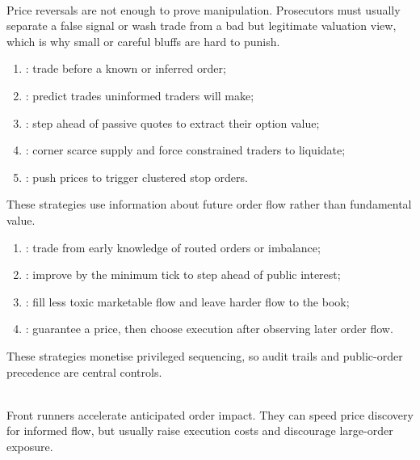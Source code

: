 \begin{caveat} \\
Price reversals are not enough to prove manipulation. Prosecutors must usually separate a false signal or wash trade from a bad but legitimate valuation view, which is why small or careful bluffs are hard to punish.
\end{caveat}

\begin{taxonomy} 
\begin{enumerate}[label=\roman*.]
\setlength{\itemsep}{0pt}
\item {}: trade before a known or inferred order;
\item {}: predict trades uninformed traders will make;
\item {}: step ahead of passive quotes to extract their option value;
\item {}: corner scarce supply and force constrained traders to liquidate;
\item {}: push prices to trigger clustered stop orders.
\end{enumerate}
These strategies use information about future order flow rather than fundamental value.
\end{taxonomy}

\begin{taxonomy} 
\begin{enumerate}[label=\roman*.]
\setlength{\itemsep}{0pt}
\item {}: trade from early knowledge of routed orders or imbalance;
\item {}: improve by the minimum tick to step ahead of public interest;
\item {}: fill less toxic marketable flow and leave harder flow to the book;
\item {}: guarantee a price, then choose execution after observing later order flow.
\end{enumerate}
These strategies monetise privileged sequencing, so audit trails and public-order precedence are central controls.
\end{taxonomy}

\begin{mechanism} \\
Front runners accelerate anticipated order impact. They can speed price discovery for informed flow, but usually raise execution costs and discourage large-order exposure.
\end{mechanism}

